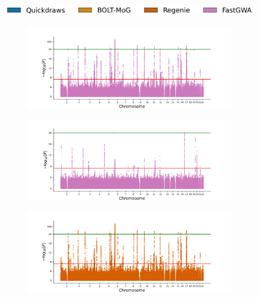 \begin{figure}[h!]
    \centering
    \includegraphics[scale=0.425]{figures/manhattan_bin/legend.png}
    \begin{subfigure}{.5\textwidth}
    \includegraphics[width=\textwidth]{figures/manhattan_bin/fastgwa_400k1.png}
    \end{subfigure}%
    \begin{subfigure}{.5\textwidth}
    \includegraphics[width=\textwidth]{figures/manhattan_bin/fastgwa_400k16.png}
    \end{subfigure}
    \begin{subfigure}{.5\textwidth}
    \includegraphics[width=\textwidth]{figures/manhattan_bin/regenie_400kAsthma.png}
    \end{subfigure}%
    \begin{subfigure}{.5\textwidth}

\end{subfigure}
\end{figure}
